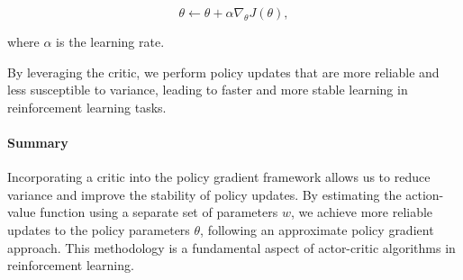 \documentclass[10pt, oneside]{article}
\theoremstyle{definition}
\begin{document}
\[
\theta \leftarrow \theta + \alpha \nabla_\theta J(\theta),
\]

where \( \alpha \) is the learning rate.

By leveraging the critic, we perform policy updates that are more reliable and less susceptible to variance, leading to faster and more stable learning in reinforcement learning tasks.

\paragraph{Summary}

Incorporating a critic into the policy gradient framework allows us to reduce variance and improve the stability of policy updates. By estimating the action-value function using a separate set of parameters \( w \), we achieve more reliable updates to the policy parameters \( \theta \), following an approximate policy gradient approach. This methodology is a fundamental aspect of actor-critic algorithms in reinforcement learning.
\end{document}
